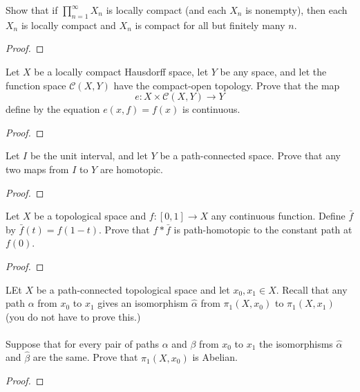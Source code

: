 \begin{problem}
Show that if $\prod_{n=1}^\infty X_n$ is locally compact (and
each $X_n$ is nonempty), then each $X_n$ is locally compact and
$X_n$ is compact for all but finitely many $n$.
\end{problem}
\begin{proof}
\end{proof}
\begin{problem}
Let $X$ be a locally compact Hausdorff space, let $Y$ be any
space, and let the function space $\mathcal{C}(X,Y)$ have the
compact-open topology. Prove that the map
\[
e\colon X\times\mathcal{C}(X,Y)\to Y
\]
define by the equation $e(x,f)=f(x)$ is continuous.
\end{problem}
\begin{proof}
\end{proof}
\begin{problem}
Let $I$ be the unit interval, and let $Y$ be a path-connected
space. Prove that any two maps from $I$ to $Y$ are homotopic.
\end{problem}
\begin{proof}
\end{proof}
\begin{problem}
Let $X$ be a topological space and $f\colon[0,1]\to X$ any
continuous function. Define $\bar f$ by $\bar f(t)=f(1-t)$. Prove
that $f*\bar f$ is path-homotopic to the constant path at $f(0)$.
\end{problem}
\begin{proof}
\end{proof}
\begin{problem}
LEt $X$ be a path-connected topological space and let $x_0,x_1\in
X$. Recall that any path $\alpha$ from $x_0$ to $x_1$  gives an
isomorphism $\hat\alpha$ from $\pi_1(X,x_0)$ to $\pi_1(X,x_1)$
(you do not have to prove this.)
\\\\
Suppose that for every pair of paths $\alpha$ and $\beta$ from
$x_0$ to $x_1$ the isomorphisms $\hat\alpha$ and $\hat\beta$  are
the same. Prove that $\pi_1(X,x_0)$ is Abelian.
\end{problem}
\begin{proof}
\end{proof}

